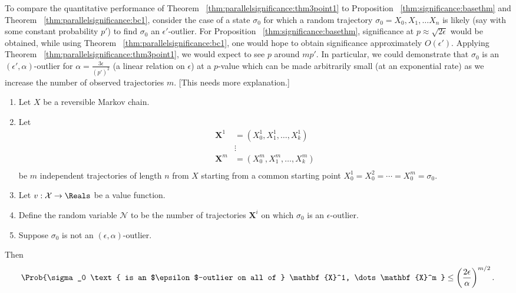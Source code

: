 \documentclass[12pt]{article}
\begin{document}
\begin{example}
    To compare the quantitative performance of Theorem~%
    \ref{thm:parallelsignificance:thm3point1} to Proposition~%
    \ref{thm:significance:basethm} and Theorem~%
    \ref{thm:parallelsignificance:bc1}, consider the case of a state \( \sigma_0
    \) for which a random trajectory \( \sigma_0 = X_0 , X_1 , \dots X_n
    \) is likely (say with some constant probability \( p' \)) to find \(
    \sigma_0 \) an \( \epsilon' \)-outlier.  For Proposition~%
    \ref{thm:significance:basethm}, significance at \( p \approx \sqrt{2\epsilon}
    \) would be obtained, while using Theorem~%
    \ref{thm:parallelsignificance:bc1}, one would hope to obtain significance
    approximately \( O(\epsilon') \).  Applying Theorem~%
    \ref{thm:parallelsignificance:thm3point1}, we would expect to see \( p \)
    around \( m p' \).  In particular, we could demonstrate that \(
    \sigma_0 \) is an \( (\epsilon', \alpha) \)-outlier for \( \alpha =
    \frac{3\epsilon} {(p')^2} \) (a linear relation on \( \epsilon \))
    at a \( p \)-value which can be made arbitrarily small (at an
    exponential rate) as we increase the number of observed trajectories
    \( m \).  [This needs more explanation.]
\end{example}

\begin{theorem}
    \label{thm:parallelsignificance:thm5}
    \begin{enumerate}
        \item
            Let \( X \) be a reversible Markov chain.
        \item
            Let
            \begin{align*}
                \mathbf{X}^1 &= (X_0^1, X_1^1, \dots, X_k^1 )\\
                &\vdots \\
                \mathbf{X}^m &= (X_0^m, X_1^m, \dots, X_k^m )\\
            \end{align*}
            be \( m \) independent trajectories of length \( n \) from \(
            X \) starting from a common starting point \( X_0^1 = X_0^2
            = \cdots = X_0^m = \sigma_0 \).
        \item
            Let \( v :  \mathcal{X} \to \Reals \) be a value function.
        \item
            Define the random variable \( \mathcal{N} \) to be the
            number of trajectories \( \mathbf{X}^i \) on which \( \sigma_0
            \) is an \( \epsilon \)-outlier.
        \item
            Suppose \( \sigma_0 \) is not an \( (\epsilon, \alpha) \)-outlier.
    \end{enumerate}
    Then
    \[
        \Prob{\sigma_0 \text{ is an $\epsilon$-outlier on all of } \mathbf
        {X}^1, \dots \mathbf{X}^m } \le \left( \frac{2\epsilon}{\alpha}
        \right)^{m/2}.
    \]

  \end{theorem}
\end{document}
